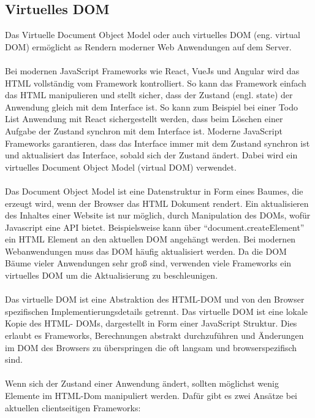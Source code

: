 \documentclass[runningheads]{llncs}
\begin{document}
\subsection{Virtuelles DOM}
\label{subsec:Virtuelles DOM}
Das Virtuelle Document Object Model
oder auch virtuelles DOM (eng. virtual DOM) ermöglicht 
as Rendern moderner Web Anwendungen auf dem Server.
\\
\\
Bei modernen JavaScript Frameworks wie React, 
VueJs und Angular wird das HTML vollständig vom Framework kontrolliert. 
So kann das Framework einfach das HTML manipulieren und stellt sicher, 
dass der Zustand (engl. state) der Anwendung gleich mit dem Interface ist. 
So kann zum Beispiel bei einer Todo List Anwendung mit React sichergestellt werden, 
dass beim Löschen einer Aufgabe der Zustand synchron mit dem Interface ist. 
Moderne JavaScript Frameworks garantieren, 
dass das Interface immer mit dem Zustand synchron ist und aktualisiert das Interface, 
sobald sich der Zustand ändert. 
Dabei wird ein virtuelles Document Object Model (virtual DOM) verwendet.
\\
\\
Das Document Object Model ist eine Datenstruktur in Form eines Baumes, 
die erzeugt wird, wenn der Browser das HTML Dokument rendert. 
Ein aktualisieren des Inhaltes einer Website ist nur möglich, 
durch Manipulation des DOMs, wofür Javascript eine API bietet. 
Beispielsweise kann über “document.createElement” ein HTML Element 
an den aktuellen DOM angehängt werden. 
Bei modernen Webanwendungen muss das DOM häufig aktualisiert werden. 
Da die DOM Bäume vieler Anwendungen sehr groß sind, 
verwenden viele Frameworks ein virtuelles DOM um die 
Aktualisierung zu beschleunigen. 
\\
\\
Das virtuelle DOM ist eine Abstraktion des HTML-DOM und 
von den Browser spezifischen Implementierungsdetails getrennt. 
Das virtuelle DOM ist eine lokale Kopie des HTML- DOMs, 
dargestellt in Form einer JavaScript Struktur. 
Dies erlaubt es Frameworks, 
Berechnungen abstrakt durchzuführen und Änderungen im DOM des Browsers 
zu überspringen die oft langsam und browserspezifisch sind.
\\
\\
Wenn sich der Zustand einer Anwendung ändert, 
sollten möglichst wenig Elemente im HTML-Dom manipuliert werden. 
Dafür gibt es zwei Ansätze bei aktuellen clientseitigen Frameworks:
\end{document}
